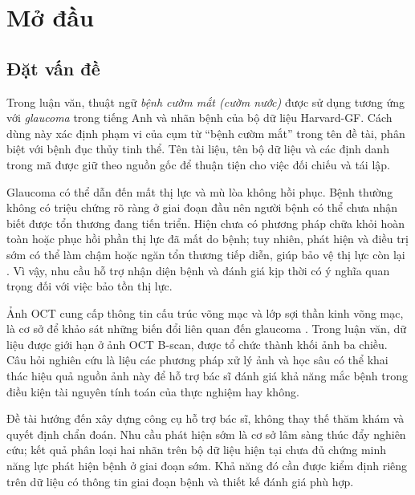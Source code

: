 \documentclass[14pt,a4paper,oneside]{extreport}
\begin{document}
\clearpage
{}
{}
\listoffigures

\clearpage
{}
\setcounter{page}{1}

\chapter{Mở đầu}
\label{chap:introduction}

\section{Đặt vấn đề}
Trong luận văn, thuật ngữ \textit{bệnh cườm mắt (cườm nước)} được
sử dụng tương ứng với \textit{glaucoma} trong tiếng Anh và nhãn bệnh
của bộ dữ liệu Harvard-GF. Cách dùng này xác định phạm vi của cụm
từ ``bệnh cườm mắt'' trong tên đề tài, phân biệt với bệnh đục thủy
tinh thể. Tên tài liệu, tên bộ dữ liệu và các định danh trong mã
được giữ theo nguồn gốc để thuận tiện cho việc đối chiếu và tái lập.

Glaucoma có thể dẫn đến mất thị lực và mù lòa
không hồi phục. Bệnh thường
không có triệu chứng rõ ràng ở giai đoạn đầu nên người bệnh có thể
chưa nhận biết được tổn thương đang tiến triển. Hiện chưa có phương
pháp chữa khỏi hoàn toàn hoặc phục hồi phần thị lực đã mất do bệnh;
tuy nhiên, phát hiện và điều trị sớm có thể làm chậm hoặc ngăn
tổn thương tiếp diễn, giúp bảo vệ thị lực còn lại
\cite{neiGlaucoma}. Vì vậy, nhu cầu hỗ trợ nhận diện bệnh và đánh giá
kịp thời có ý nghĩa quan trọng đối với việc bảo tồn thị lực.

Ảnh OCT cung cấp thông tin cấu trúc võng mạc và lớp sợi thần kinh
võng mạc, là cơ sở để khảo sát những biến đổi liên quan đến glaucoma
\cite{guedes2003oct}. Trong luận văn, dữ liệu được giới hạn ở ảnh
OCT B-scan, được tổ chức thành khối ảnh ba chiều. Câu hỏi nghiên cứu
là liệu các phương pháp xử lý ảnh và học sâu có thể khai thác hiệu
quả nguồn ảnh này để hỗ trợ bác sĩ đánh giá khả năng mắc bệnh
trong điều kiện tài nguyên tính toán của thực nghiệm hay không.

Đề tài hướng đến xây dựng công cụ hỗ trợ bác sĩ,
không thay thế thăm khám và quyết định chẩn đoán. Nhu cầu phát hiện sớm
là cơ sở lâm sàng thúc đẩy nghiên cứu; kết quả phân loại hai nhãn trên bộ
dữ liệu hiện tại chưa đủ chứng minh năng lực phát hiện bệnh ở giai
đoạn sớm. Khả năng đó cần được kiểm định riêng trên dữ liệu có thông
tin giai đoạn bệnh và thiết kế đánh giá phù hợp.
\end{document}

